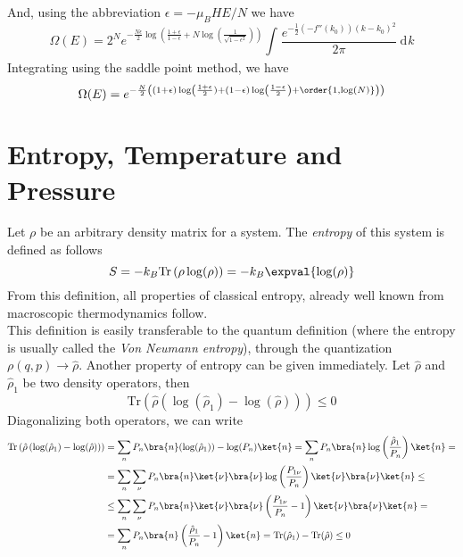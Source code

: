 \documentclass[a4paper, 11pt]{book}
\renewcommand{\trace}{\mathrm{Tr}}
\newcommand{\1}{\opr{\mathds{1}}}
\newcommand{\diff}[2][]{\ \mathrm{d}^{#1}#2}
\newcommand{\opr}[1]{\hat{#1}}
\theoremstyle{plain}
\begin{document}
		And, using the abbreviation $\epsilon=-\mu_BHE/N$ we have
		\begin{equation}
			\Omega(E)=2^Ne^{-\frac{N\epsilon}{2}\log\left( \frac{1+\epsilon}{1-\epsilon}+N\log\left( \frac{1}{\sqrt{1-\epsilon^2}} \right) \right)}\int_{}^{}\frac{e^{-\frac{1}{2}(-f''(k_0))(k-k_0)^2}}{2\pi}\diff{k}
			\label{eq:OmegaEapproximation}
		\end{equation}
		Integrating using the saddle point method, we have
		\begin{equation}
		\Omega(E)=e^{-\frac{N}{2}\left( (1+\epsilon)\log\left( \frac{1+\epsilon}{2})+(1-\epsilon)\log\left( \frac{1-\epsilon}{2} \right)+\order{1,\log(N)} \right) \right)}
			\label{eq:OmegaEparamagnet}
		\end{equation}
		\section{Entropy, Temperature and Pressure}
		Let $\rho$ be an arbitrary density matrix for a system. The \textit{entropy} of this system is defined as follows
		\begin{equation}
			S=-k_B\trace\left( \rho\log(\rho) \right)=-k_B\expval{\log(\rho)}
			\label{eq:generalentropy}
		\end{equation}
		From this definition, all properties of classical entropy, already well known from macroscopic thermodynamics follow.\\
		This definition is easily transferable to the quantum definition (where the entropy is usually called the \textit{Von Neumann entropy}), through the quantization $\rho(q,p)\to\opr{\rho}$. Another property of entropy can be given immediately. Let $\opr{\rho}$ and $\opr{\rho}_1$ be two density operators, then
		\begin{equation}
			\trace\left( \opr{\rho}\left( \log(\opr{\rho}_1)-\log(\opr{\rho}) \right) \right)\le0
			\label{eq:entropypropertynegativetrace}
		\end{equation}
		Diagonalizing both operators, we can write
		\begin{equation*}
			\begin{aligned}
				\trace\left( \opr{\rho}\left( \log(\opr{\rho}_1)-\log(\opr{\rho}) \right) \right)&=\sum_nP_n\bra{n}(\log(\opr{\rho}_1))-\log(P_n)\ket{n}=\sum_nP_n\bra{n}\log\left( \frac{\opr{\rho}_1}{P_n} \right)\ket{n}=\\
				&=\sum_n\sum_\nu P_n\bra{n}\ket{\nu}\bra{\nu}\log\left( \frac{P_{1\nu}}{P_n} \right)\ket{\nu}\bra{\nu}\ket{n}\le\\
				&\le\sum_n\sum_\nu P_n\bra{n}\ket{\nu}\bra{\nu}\left( \frac{P_{1\nu}}{P_n}-1 \right)\ket{\nu}\bra{\nu}\ket{n}=\\
				&=\sum_nP_n\bra{n}\left( \frac{\opr{\rho}_1}{P_n}-1 \right)\ket{n}=\trace(\opr{\rho}_1)-\trace(\opr{\rho})\le0
			\end{aligned}
		\end{equation*}
\end{document}
